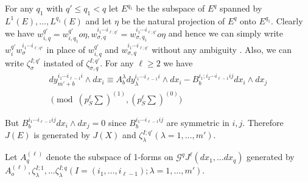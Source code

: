 \begin{remark*}
  For any $q_1$ with $q' \leq q_1 < q$ let $E^{q_1}$ be the subspace
  of $E^q$ spanned by $L^1 (E), \ldots, L^{q_1} (E)$ and let $\eta$ be
  the natural projection of $E^q$ onto $E^{q_1}$. Clearly we have $w_{i,q}^{q'} =
  w_{i,q_1}^{q'} o \eta, w_{\sigma, q}^{i_1 \cdots i_{\ell; q'}} =
  w_{\sigma, q_1}^{i_1 \cdots i_{\ell; q'}} o \eta $ and hence we can
  simply  write $w_i^{q'} w_{\sigma}^{i_1 \cdots i_{\ell ; q^1}}$ in
  place of $w^{q'}_{i,q}$ and $w_{\sigma, q}^{i_1 \cdots i_{\ell; q'}}$
  without any ambiguity . Also, we can write $\zeta_{\sigma}^{I;q'}$
  instated of $\zeta_{\sigma, q}^{I;q'}$. For any $\ell \geq 2$ we
  have 
  \begin{multline*}
    dy_{m'+b}^{i_1 \cdots i_{\ell -1}i} \wedge dx_i \equiv
    A_b^{\lambda} dy_\lambda^{i_1 \cdots i_{\ell -1}i} \wedge dx_i -
    B_b^{i_1; i_2 \cdots i_{\ell -1}ij} dx_i \wedge dx_j\\ 
    \pmod {\left(p_S^\ell \sum\right)^{(1)}, \left(p_S^\ell \sum \right)^{(0)}} 
  \end{multline*}
\end{remark*}

But $B_b^{i_1 \cdots i_{\ell -1}ij} dx_i \wedge dx_j =0$ since $B_b^{
  i_1 \cdots i_{\ell -1}ij}$ are symmetric in $i,j$. Therefore $J(E)$
is generated by $J(X)$ and $\zeta_{\lambda}^{I;q'} (\lambda= 1, \ldots
, m')$. 

Let $A_q^{(\ell)}$ denote the subspace of 1-forms on $\mathscr{G}^q
J^{\ell} (dx_1, \ldots dx_q)$ generated by $A_o^{(\ell)},
\zeta_{\lambda}^{I;1}, \ldots \zeta_{\lambda}^{I;q} (I = (i_1, \ldots
, i_{\ell -1}); \lambda = 1, \ldots , m')$. 

